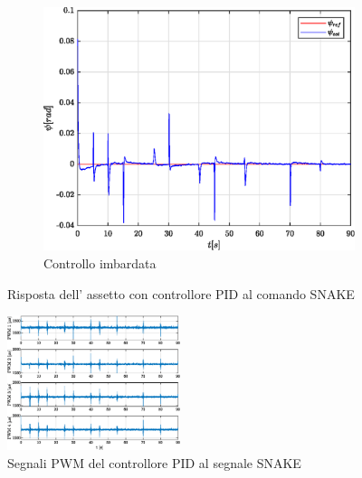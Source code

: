 \begin{figure}
	\hfill
	\begin{subfigure}{0.45\textwidth}
		\centering
		\includegraphics[width=1\textwidth]{Simulazioni/Figure/PID/SNAKE/AttitudeControlYaw}
		\caption{Controllo imbardata}
		\label{fig:SNAKEerryawPID}
	\end{subfigure}
	\caption{Risposta dell' assetto con controllore PID al comando SNAKE}
\end{figure}

\begin{figure}
	\centering
	\includegraphics[width=0.45\textwidth]{Simulazioni/Figure/PID/SNAKE/PWM}
	\caption{Segnali PWM del controllore PID al segnale SNAKE}
	\label{fig:SNAKEPWMPID}
\end{figure}

